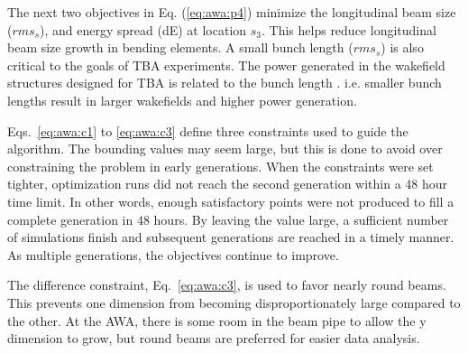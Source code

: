 The next two objectives in Eq. (\ref{eq:awa:p4}) minimize the 
longitudinal beam size ($rms_s$), and energy spread (dE) at location $s_3$.
This helps reduce longitudinal beam size growth in bending elements.
A small bunch length ($rms_s$) is also critical to the goals of 
TBA experiments. The power generated in the wakefield structures 
designed for TBA is related to the bunch length \cite{JING201872}.
i.e. smaller bunch lengths result in larger wakefields and higher power generation.
 
  

Eqs.~\ref{eq:awa:c1} to \ref{eq:awa:c3} 
define three constraints used to guide the algorithm.
The bounding values may seem large, but this is done to avoid over constraining the 
problem in early generations. When the constraints were set tighter, 
optimization runs did not reach the second generation within a 48 hour time limit. 
In other words, enough satisfactory points were not produced to fill a complete generation in 48 hours. 
By leaving the value large, a sufficient number of simulations finish
and subsequent generations are reached in a timely manner. 
As multiple generations, the objectives continue to improve.

The difference constraint, Eq.~\ref{eq:awa:c3}, is used to favor nearly round beams.
This prevents one dimension from becoming disproportionately large compared to the other.
At the AWA, there is some room in the beam pipe to allow the y dimension to grow, but round beams 
are preferred for easier data analysis.

